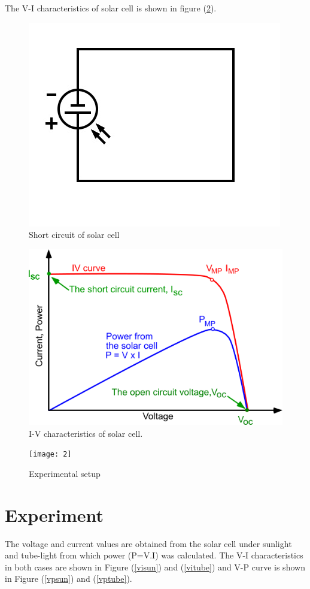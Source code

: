 \documentclass[a4paper, amsfonts, amssymb, amsmath, reprint, showkeys, nofootinbib, twoside]{revtex4-1}
\begin{document}
The V-I characteristics of solar cell is shown in figure (\ref{4}).

\begin{figure}[H]
	\centering
	\includegraphics[scale=0.3]{3}
	\caption{Short circuit of solar cell}
	\label{sc}
\end{figure}

\begin{figure}[H]\label{vi}
	\centering
	\includegraphics[scale=0.5]{4} 
	\caption{I-V characteristics of solar cell.}
	\label{4}
\end{figure}

\begin{figure}[H]
	\centering
	\texttt{[image: 2]}
	\caption{Experimental setup}
	\label{e}
\end{figure}

\section{Experiment}
The voltage and current values are obtained from the solar cell under sunlight and tube-light from which power (P=V.I) was calculated. The V-I characteristics in both cases are shown in Figure (\ref{visun}) and (\ref{vitube}) and V-P curve is shown in Figure (\ref{vpsun}) and (\ref{vptube}).
\end{document}
